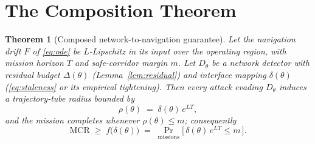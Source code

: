 \documentclass[conference]{IEEEtran}
\newcommand{\MCR}{\mathrm{MCR}}
\newtheorem{theorem}{Theorem}
\begin{document}
\section{The Composition Theorem}
\label{sec:theorem}
\begin{theorem}[Composed network-to-navigation guarantee]
\label{thm:main}
Let the navigation drift $F$ of \eqref{eq:ode} be $L$-Lipschitz in its input over
the operating region, with mission horizon $T$ and safe-corridor margin $m$.
Let $D_\theta$ be a network detector with residual budget $\Delta(\theta)$
(Lemma~\ref{lem:residual}) and interface mapping $\delta(\theta)$
(\eqref{eq:staleness} or its empirical tightening). Then every attack evading
$D_\theta$ induces a trajectory-tube radius bounded by
\begin{equation}
\label{eq:tube}
\rho(\theta) \;=\; \delta(\theta)\,e^{L T},
\end{equation}
and the mission completes whenever $\rho(\theta) \le m$; consequently
\begin{equation}
\label{eq:floor}
\MCR \;\ge\; f\big(\delta(\theta)\big) \;=\; \Pr_{\text{missions}}\!\big[\,\delta(\theta)\,e^{LT}\le m\,\big].
\end{equation}
\end{theorem}
\end{document}
